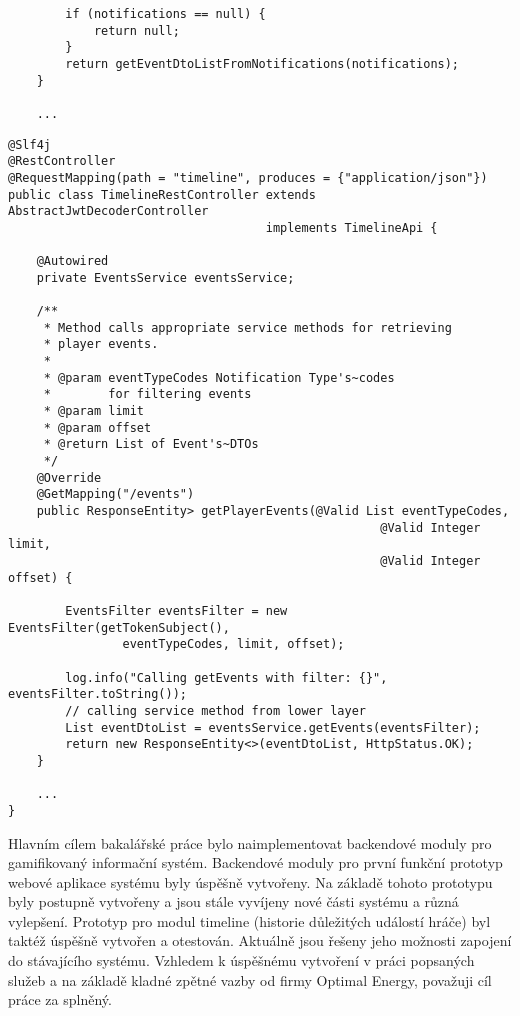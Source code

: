 \documentclass[12pt]{article}
\begin{document}
{\begin{lstlisting}
        if (notifications == null) {
            return null;
        }
        return getEventDtoListFromNotifications(notifications);
    }
    
    ...

\end{lstlisting}


\clearpage


\begin{lstlisting}
@Slf4j
@RestController
@RequestMapping(path = "timeline", produces = {"application/json"})
public class TimelineRestController extends AbstractJwtDecoderController
                                    implements TimelineApi {

    @Autowired
    private EventsService eventsService;

    /**
     * Method calls appropriate service methods for retrieving
     * player events.
     *
     * @param eventTypeCodes Notification Type's~codes
     *        for filtering events
     * @param limit
     * @param offset
     * @return List of Event's~DTOs
     */
    @Override
    @GetMapping("/events")
    public ResponseEntity> getPlayerEvents(@Valid List eventTypeCodes,
                                                    @Valid Integer limit,
                                                    @Valid Integer offset) {

        EventsFilter eventsFilter = new EventsFilter(getTokenSubject(),
                eventTypeCodes, limit, offset);

        log.info("Calling getEvents with filter: {}", eventsFilter.toString());
        // calling service method from lower layer
        List eventDtoList = eventsService.getEvents(eventsFilter);
        return new ResponseEntity<>(eventDtoList, HttpStatus.OK);
    }
    
    ...
}
\end{lstlisting}




\sekce{}


Hlavním cílem bakalářské práce bylo naimplementovat backendové moduly pro gamifikovaný informační systém.
Backendové moduly pro první funkční prototyp webové aplikace systému byly
úspěšně vytvořeny.
Na základě tohoto prototypu byly postupně vytvořeny
a jsou stále vyvíjeny nové části systému a různá vylepšení.
Prototyp pro modul timeline (historie důležitých událostí hráče) byl taktéž úspěšně vytvořen
a otestován. Aktuálně jsou řešeny jeho možnosti zapojení do stávajícího systému.
Vzhledem k úspěšnému vytvoření v práci popsaných služeb a na základě kladné zpětné vazby od firmy Optimal Energy,
považuji cíl práce za splněný.


}
\end{document}
